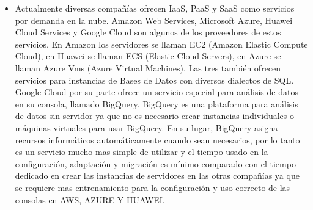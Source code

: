 \documentclass[12pt,a4paper,openright]{article}
\begin{document}
\begin{itemize}
    \item Actualmente diversas compañías ofrecen IaaS, PaaS y SaaS como servicios por demanda en la nube. Amazon Web Services, Microsoft Azure, Huawei Cloud Services y Google Cloud son algunos de los proveedores de estos servicios. En Amazon los servidores se llaman EC2 (Amazon Elastic Compute Cloud), en Huawei se llaman ECS (Elastic Cloud Servers), en Azure se llaman Azure Vms (Azure Virtual Machines). Las tres también ofrecen servicios para instancias de Bases de Datos con diversos dialectos de SQL. Google Cloud por su parte ofrece un servicio especial para análisis de datos en su consola, llamado BigQuery. BigQuery es una plataforma para análisis de datos sin servidor ya que no es necesario crear instancias individuales o máquinas virtuales para usar BigQuery. En su lugar, BigQuery asigna recursos informáticos automáticamente cuando sean necesarios, por lo tanto es un servicio mucho mas simple de utilizar y el tiempo usado en la configuración, adaptación y migración es mínimo comparado con el tiempo dedicado en crear las instancias de servidores en las otras compañías ya que se requiere mas entrenamiento para la configuración y uso correcto de las consolas en AWS, AZURE Y HUAWEI.
\end{itemize}
\end{document}
